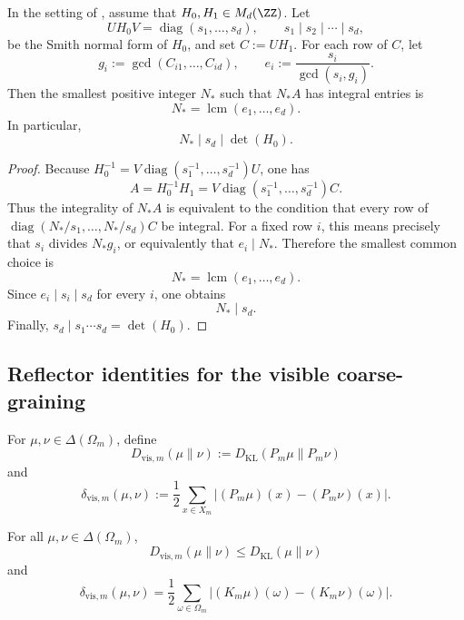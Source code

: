 \begin{theorem}
\label{thm:smith-denominator}
In the setting of , assume that
\(H_0,H_1\in M_d(\ZZ)\).  Let
\[
  UH_0V=\operatorname{diag}(s_1,\dots,s_d),
  \qquad
  s_1\mid s_2\mid\cdots\mid s_d,
\]
be the Smith normal form of \(H_0\), and set \(C:=UH_1\).  For each row of
\(C\), let
\[
  g_i:=\gcd(C_{i1},\dots,C_{id}),
  \qquad
  e_i:=\frac{s_i}{\gcd(s_i,g_i)}.
\]
Then the smallest positive integer \(N_*\) such that \(N_*A\) has integral
entries is
\[
  N_* = \operatorname{lcm}(e_1,\dots,e_d).
\]
In particular,
\[
  N_*\mid s_d\mid \det(H_0).
\]
\end{theorem}

\begin{proof}
Because \(H_0^{-1}=V\operatorname{diag}(s_1^{-1},\dots,s_d^{-1})U\), one has
\[
  A
  =
  H_0^{-1}H_1
  =
  V\operatorname{diag}(s_1^{-1},\dots,s_d^{-1})C.
\]
Thus the integrality of \(N_*A\) is equivalent to the condition that every row
of \(\operatorname{diag}(N_*/s_1,\dots,N_*/s_d)C\) be integral.  For a fixed
row \(i\), this means precisely that \(s_i\) divides \(N_* g_i\), or
equivalently that \(e_i\mid N_*\).  Therefore the smallest common choice is
\[
  N_*=\operatorname{lcm}(e_1,\dots,e_d).
\]
Since \(e_i\mid s_i\mid s_d\) for every \(i\), one obtains
\[
  N_*\mid s_d.
\]
Finally, \(s_d\mid s_1\cdots s_d=\det(H_0)\).
\end{proof}

\subsection{Reflector identities for the visible coarse-graining}

\begin{definition}
\label{def:visible-divergence}
For \(\mu,\nu\in\Delta(\Omega_m)\), define
\[
  D_{\mathrm{vis},m}(\mu\|\nu)
  :=
  D_{\mathrm{KL}}(P_m\mu\|P_m\nu)
\]
and
\[
  \delta_{\mathrm{vis},m}(\mu,\nu)
  :=
  \frac12\sum_{x\in X_m}\bigl|(P_m\mu)(x)-(P_m\nu)(x)\bigr|.
\]
\end{definition}

\begin{proposition}
\label{prop:visible-contraction}
For all \(\mu,\nu\in\Delta(\Omega_m)\),
\[
  D_{\mathrm{vis},m}(\mu\|\nu)\le D_{\mathrm{KL}}(\mu\|\nu)
\]
and
\[
  \delta_{\mathrm{vis},m}(\mu,\nu)
  =
  \frac12\sum_{\omega\in\Omega_m}
  \bigl|(K_m\mu)(\omega)-(K_m\nu)(\omega)\bigr|.
\]
\end{proposition}

